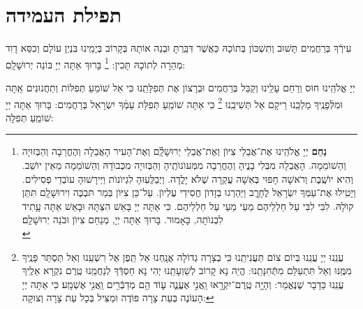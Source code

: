 \documentclass[twoside, openany, parskip=half, 11pt]{book}
\begin{document}
 
\section*{ תפילת העמידה }


\weekdaysaavos

\weekdaysamechayey

\weekdaysakedusha \sepline 

\weekdaysakiddushhashem

\weekdaysabinah

\weekdaysateshuva

\weekdaysaselichah

\weekdaysageulah

\weekdaysaanneinu

\weekdaysarefuah

\weekdaysaberacha

\weekdaysashofar

\weekdaysamishpat

\weekdaysaminim

\weekdaysatzadikim

 עִירְֿךָ בְּרַחֲמִים תָּשׁוּב וְתִשְׁכּוֹן בְּתוֹכָהּ כַּאֲשֶׁר דִּבַּֽרְתָּ וּבְנֵה אוֹתָהּ בְּקָרוֹב בְּיָמֵֽינוּ בִּנְיַן עוֹלָם וְכִסֵּא דָוִד מְהֵרָה לְתוֹכָהּ תָּכִין: 
 \footnote{
\textbf{נַחֵם}
 יְיָ אֱלֹהֵֽינוּ אֶת־אֲבֵלֵי צִיּוֺן וְאֶת־אֲבֵלֵי יְרוּשָׁלַֽ֔֗͏ִם וְאֶת־הָעִיר הָאֲבֵלָה וְהֶחֳרֵבָה וְהַבְּזוּיָה וְהַשׁוֺמֵמָה. הָאֲבֵלָה מִבְּלִי בָנֱיהָ וְהֶחֳרֵבָה מִמְּעוֺנוֺתֶֽיהָ וְהַבְּזוּיָה מִכְּבוֺדָהּ וְהַשׁוֺמֵמָה מֵאֵין יוֺשֵׁב. וְהִיא יוֺשֶֽׁבֶת וְרֹאשָׁה חָפוּי בְּאִשָׁה עֲקַרָה שֶׁלֹּא יָלֳדָה. וַיְבַלְְּעֽוּהָ לִגְיוֺנוֺת וַיְּירָשׁוּהָ עוֺבְדֵי פְסִילִים. וַיָטִֽילוּ אֶת־עַמְּךָ יִשְׂרָאֵל לֶחָרֱֽב וַיַּהַרְגוּ בְזָדוֺן חֲסִידֵי עֶלְיוֺן. עַל־כֵּן צִיּוֺן בְּמַר תּבְכֶּה וִירוּשָׁלַֽ͏ִם תִּתֵּן קוֺלָהּ. לִבִּי לִבִּי עַל חַלְלֵיהֶם מֵעַי מֵעַי עַל חַלְלֵיהֶם. כִּי אַתָּה יְיָ בָּאֵשׁ הִצַּתָּהּ וּבָאֵשׁ אַתָּה עָָתִיד לִבְנוֺתָה, כָּאָמוּר. בָּרוּךְ אַתָּה יְיָ, מְנַחֵם צִיוֺן וּבֹנֵה יְרוּשָׁלַֽ͏ִם׃ \\
}
 בָּרוּךְ אַתָּה יְיָ בּוֹנֵה יְרוּשָׁלָֽםִ:

\weekdaysamalchus

 יְיָ אֱלֹהֵֽינוּ חוּס וְרַחֵם עָלֵֽינוּ וְקַבֵּל בְּרַחֲמִים וּבְרָצוֹן אֶת תְּפִלָּתֵֽנוּ כִּי אֵל שׁוֹמֵעַ תְּפִלּוֹת וְתַחֲנוּנִים אַֽתָּה וּמִלְּֿפָנֶֽיךָ מַלְכֵּֽנוּ רֵיקָם אַל תְּשִׁיבֵֽנוּ
\footnote{
עֲנֵֽנוּ יְיָ עֲנֵֽנוּ בְּיוֹם צוֹם תַּעֲנִיתֵֽנוּ כִּי בְצָרָה גְדוֹלָה אֲנָֽחְנוּ אַל תֵּֽפֶן אֶל רִשְׁעֵֽנוּ וְאַל תַּסְתֵּר פָּנֶֽיךָ מִמֶּֽנּוּ וְאַל תִּתְעַלַּם מִתְּֿחִנָּתֵֽנוּ: הֱיֵה נָא קָרוֹב לְשַׁוְעָתֵֽנוּ יְהִי נָא חַסְדְּֿךָ לְנַחֲמֵֽנוּ טֶֽרֶם נִקְרָא אֵלֶֽיךָ עֲנֵֽנוּ כַּדָּבָר שֶׁנֶּאֱמַר:
 וְהָיָ֥ה טֶֽרֶם־יִקְרָ֖אוּ וַֽאֲנִ֣י אֶעֱנֶ֑ה ע֛וֹד הֵ֥ם מְדַבְּֿרִ֖ים וַֽאֲנִ֥י אֶשְׁמָֽע׃ כִּי אַתָּה יְיָ הָעוֹנֶה בְּעֵת צָרָה פּוֹדֶה וּמַצִּיל בְּכָל עֵת צָרָה וְצוּקָה:
}
 כִּי אַתָּה שׁוֹמֵֽעַ תְּפִלַּת עַמְּֿךָ יִשְׂרָאֵל בְּרַחֲמִים: בָּרוּךְ אַתָּה יְיָ שׁוֹמֵֽעַ תְּפִלָּה:
\end{document}
